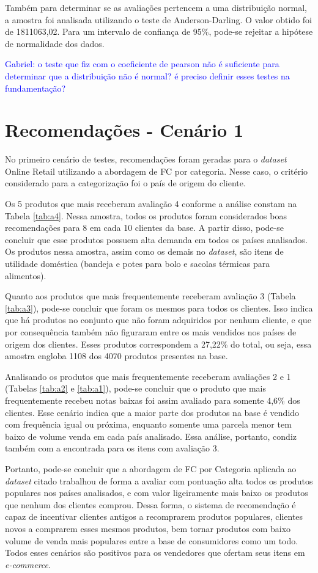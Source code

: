 Também para determinar se as avaliações pertencem a uma distribuição normal, a amostra foi analisada utilizando o teste de Anderson-Darling. O valor obtido foi de 1811063,02. Para um intervalo de confiança de 95\%, pode-se rejeitar a hipótese de normalidade dos dados. 

\textcolor{blue}{Gabriel: o teste que fiz com o coeficiente de pearson não é suficiente para determinar que a distribuição não é normal? é preciso definir esses testes na fundamentação?}

\section{Recomendações - Cenário 1} \label{cenario1}
No primeiro cenário de testes, recomendações foram geradas para o \textit{dataset} Online Retail utilizando a abordagem de FC por categoria. Nesse caso, o critério considerado para a categorização foi o país de origem do cliente.

Os 5 produtos que mais receberam avaliação 4 conforme a análise constam na Tabela \ref{tab:a4}. Nessa amostra, todos os produtos foram considerados boas recomendações para 8 em cada 10 clientes da base. A partir disso, pode-se concluir que esse produtos possuem alta demanda em todos os países analisados. Os produtos nessa amostra, assim como os demais no \textit{dataset}, são itens de utilidade doméstica (bandeja e potes para bolo e sacolas térmicas para alimentos).

Quanto aos produtos que mais frequentemente receberam avaliação 3 (Tabela \ref{tab:a3}), pode-se concluir que foram os mesmos para todos os clientes. Isso indica que há produtos no conjunto que não foram adquiridos por nenhum cliente, e que por consequência também não figuraram entre os mais vendidos nos países de origem dos clientes. Esses produtos correspondem a 27,22\% do total, ou seja, essa amostra engloba 1108 dos 4070 produtos presentes na base.

Analisando os produtos que mais frequentemente receberam avaliações 2 e 1 (Tabelas \ref{tab:a2} e \ref{tab:a1}), pode-se concluir que o produto que mais frequentemente recebeu notas baixas foi assim avaliado para somente 4,6\% dos clientes. Esse cenário indica que a maior parte dos produtos na base é vendido com frequência igual ou próxima, enquanto somente uma parcela menor tem baixo de volume venda em cada país analisado. Essa análise, portanto, condiz também com a encontrada para os itens com avaliação 3.

Portanto, pode-se concluir que a abordagem de FC por Categoria aplicada ao \textit{dataset} citado trabalhou de forma a avaliar com pontuação alta todos os produtos populares nos países analisados, e com valor ligeiramente mais baixo os produtos que nenhum dos clientes comprou. Dessa forma, o sistema de recomendação é capaz de incentivar clientes antigos a recomprarem produtos populares, clientes novos a comprarem esses mesmos produtos, bem tornar produtos com baixo volume de venda mais populares entre a base de consumidores como um todo. Todos esses cenários são positivos para os vendedores que ofertam seus itens em \textit{e-commerce}.


